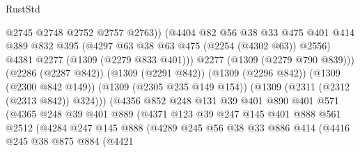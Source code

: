 \begin{lexlean}{RustStd}
\begin{coremodule}
                                @2745
                                @2748
                                @2752
                                @2757
                                @2763))
                            (@4404
                              @82
                              @56
                              @38
                              @33
                              @475
                              @401
                              @414
                              @389
                              @832
                              @395
                              (@4297 @63 @38 @63 @475 (@2254 (@4302 @63)) @2556)
                              @4381
                              @2277
                              (@1309 (@2279 @833 @401)))
                            @2277
                            (@1309 (@2279 @790 @839)))
                          (@2286 (@2287 @842))
                          (@1309 (@2291 @842))
                          (@1309 (@2296 @842))
                          (@1309 (@2300 @842 @149))
                          (@1309 (@2305 @235 @149 @154))
                          (@1309 (@2311 (@2312 (@2313 @842)) @324)))
                        (@4356
                          @852
                          @248
                          @131
                          @39
                          @401
                          @890
                          @401
                          @571
                          (@4365
                            @248
                            @39
                            @401
                            @889
                            (@4371
                              @123
                              @39
                              @247
                              @145
                              @401
                              @888
                              @561
                              @2512
                              (@4284
                                @247
                                @145
                                @888
                                (@4289
                                  @245
                                  @56
                                  @38
                                  @33
                                  @886
                                  @414
                                  (@4416
                                    @245
                                    @38
                                    @875
                                    @884
                                    (@4421

\end{coremodule}
\end{lexlean}
